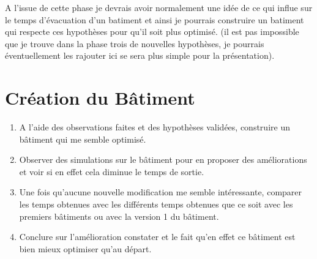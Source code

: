 \documentclass[12pt]{article}
\begin{document}
A l'issue de cette phase je devrais avoir normalement une idée de ce qui influe sur le temps d'évacuation d'un batiment
et ainsi je pourrais construire un batiment qui respecte ces hypothèses pour qu'il soit plus optimisé. (il est pas impossible que je trouve
dans la phase trois de nouvelles hypothèses, je pourrais éventuellement les rajouter ici se sera plus simple pour la présentation).

\section{Création du Bâtiment}

\begin{enumerate}
    \item A l'aide des observations faites et des hypothèses validées, construire un bâtiment qui me semble optimisé.
    \item Observer des simulations sur le bâtiment pour en proposer des améliorations et voir si en effet cela diminue le temps de sortie.
    \item Une fois qu'aucune nouvelle modification me semble intéressante, comparer les temps obtenues avec les différents temps obtenues que ce soit avec les premiers bâtiments ou avec la version 1 du bâtiment.
    \item Conclure sur l'amélioration constater et le fait qu'en effet ce bâtiment est bien mieux optimiser qu'au départ.
\end{enumerate}
\end{document}
